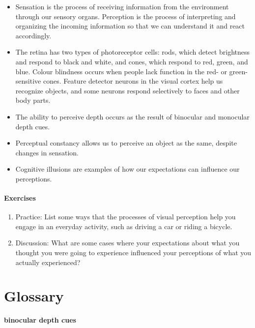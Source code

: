 \documentclass[
]{krantz}
\providecommand{\tightlist}{%
  \setlength{\itemsep}{0pt}\setlength{\parskip}{0pt}}
\begin{document}
\begin{itemize}
\tightlist
\item
  Sensation is the process of receiving information from the environment through our sensory organs. Perception is the process of interpreting and organizing the incoming information so that we can understand it and react accordingly.
\item
  The retina has two types of photoreceptor cells: rods, which detect brightness and respond to black and white, and cones, which respond to red, green, and blue. Colour blindness occurs when people lack function in the red- or green-sensitive cones.
  Feature detector neurons in the visual cortex help us recognize objects, and some neurons respond selectively to faces and other body parts.
\item
  The ability to perceive depth occurs as the result of binocular and monocular depth cues.
\item
  Perceptual constancy allows us to perceive an object as the same, despite changes in sensation.
\item
  Cognitive illusions are examples of how our expectations can influence our perceptions.
\end{itemize}

\paragraph*{Exercises}\label{exercises-1}

\begin{enumerate}
\def\labelenumi{\arabic{enumi}.}
\tightlist
\item
  Practice: List some ways that the processes of visual perception help you engage in an everyday activity, such as driving a car or riding a bicycle.
\item
  Discussion: What are some cases where your expectations about what you thought you were going to experience influenced your perceptions of what you actually experienced?
\end{enumerate}

\section{Glossary}\label{glossary-1}

\paragraph*{binocular depth cues}\label{binocular-depth-cues}
\end{document}
